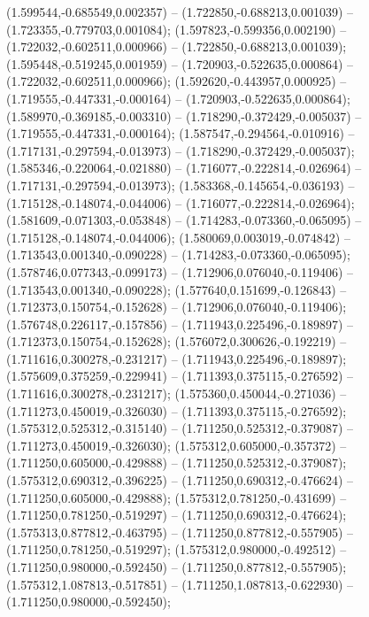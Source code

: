  (1.599544,-0.685549,0.002357) -- (1.722850,-0.688213,0.001039) -- (1.723355,-0.779703,0.001084);
 (1.597823,-0.599356,0.002190) -- (1.722032,-0.602511,0.000966) -- (1.722850,-0.688213,0.001039);
 (1.595448,-0.519245,0.001959) -- (1.720903,-0.522635,0.000864) -- (1.722032,-0.602511,0.000966);
 (1.592620,-0.443957,0.000925) -- (1.719555,-0.447331,-0.000164) -- (1.720903,-0.522635,0.000864);
 (1.589970,-0.369185,-0.003310) -- (1.718290,-0.372429,-0.005037) -- (1.719555,-0.447331,-0.000164);
 (1.587547,-0.294564,-0.010916) -- (1.717131,-0.297594,-0.013973) -- (1.718290,-0.372429,-0.005037);
 (1.585346,-0.220064,-0.021880) -- (1.716077,-0.222814,-0.026964) -- (1.717131,-0.297594,-0.013973);
 (1.583368,-0.145654,-0.036193) -- (1.715128,-0.148074,-0.044006) -- (1.716077,-0.222814,-0.026964);
 (1.581609,-0.071303,-0.053848) -- (1.714283,-0.073360,-0.065095) -- (1.715128,-0.148074,-0.044006);
 (1.580069,0.003019,-0.074842) -- (1.713543,0.001340,-0.090228) -- (1.714283,-0.073360,-0.065095);
 (1.578746,0.077343,-0.099173) -- (1.712906,0.076040,-0.119406) -- (1.713543,0.001340,-0.090228);
 (1.577640,0.151699,-0.126843) -- (1.712373,0.150754,-0.152628) -- (1.712906,0.076040,-0.119406);
 (1.576748,0.226117,-0.157856) -- (1.711943,0.225496,-0.189897) -- (1.712373,0.150754,-0.152628);
 (1.576072,0.300626,-0.192219) -- (1.711616,0.300278,-0.231217) -- (1.711943,0.225496,-0.189897);
 (1.575609,0.375259,-0.229941) -- (1.711393,0.375115,-0.276592) -- (1.711616,0.300278,-0.231217);
 (1.575360,0.450044,-0.271036) -- (1.711273,0.450019,-0.326030) -- (1.711393,0.375115,-0.276592);
 (1.575312,0.525312,-0.315140) -- (1.711250,0.525312,-0.379087) -- (1.711273,0.450019,-0.326030);
 (1.575312,0.605000,-0.357372) -- (1.711250,0.605000,-0.429888) -- (1.711250,0.525312,-0.379087);
 (1.575312,0.690312,-0.396225) -- (1.711250,0.690312,-0.476624) -- (1.711250,0.605000,-0.429888);
 (1.575312,0.781250,-0.431699) -- (1.711250,0.781250,-0.519297) -- (1.711250,0.690312,-0.476624);
 (1.575313,0.877812,-0.463795) -- (1.711250,0.877812,-0.557905) -- (1.711250,0.781250,-0.519297);
 (1.575312,0.980000,-0.492512) -- (1.711250,0.980000,-0.592450) -- (1.711250,0.877812,-0.557905);
 (1.575312,1.087813,-0.517851) -- (1.711250,1.087813,-0.622930) -- (1.711250,0.980000,-0.592450);
